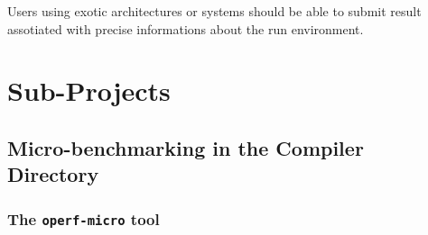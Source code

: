 \documentclass[11pt,a4paper]{article}
\begin{document}
Users using exotic architectures or systems should be able to submit
result assotiated with precise informations about the run environment.

\section{Sub-Projects}

\subsection{Micro-benchmarking in the Compiler Directory}

\subsubsection{The {\tt operf-micro} tool}
\end{document}
